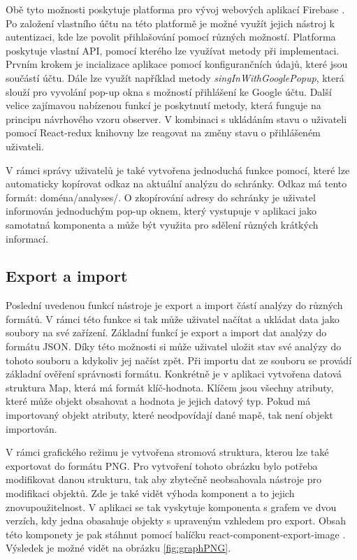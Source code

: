 Obě tyto možnosti poskytuje platforma pro vývoj webových aplikací Firebase \cite{firebase}. Po založení vlastního účtu na této platformě je možné využít jejich nástroj k autentizaci, kde lze povolit přihlašování pomocí různých možností. Platforma poskytuje vlastní API, pomocí kterého lze využívat metody při implementaci. Prvním krokem je incializace aplikace pomocí konfigurančních údajů, které jsou součástí účtu. Dále lze využít například metody \textit{singInWithGooglePopup}, která slouží pro vyvolání pop-up okna s možností přihlášení ke Google účtu. Další velice zajímavou nabízenou funkcí je poskytnutí metody, která funguje na principu návrhového vzoru observer. V kombinaci s ukládáním stavu o uživateli pomocí React-redux knihovny lze reagovat na změny stavu o přihlášeném uživateli. 

V rámci správy uživatelů je také vytvořena jednoduchá funkce pomocí, které lze automaticky kopírovat odkaz na aktuální analýzu do schránky. Odkaz má tento formát: doména/analyses/. O zkopírování adresy do schránky je uživatel informován jednoduchým pop-up oknem, který vystupuje v aplikaci jako samotatná komponenta a může být využita pro sdělení různých krátkých informací.  


\subsection{Export a import}
Poslední uvedenou funkcí nástroje je export a import částí analýzy do různých formátů. V rámci této funkce si tak může uživatel načítat a ukládat data jako soubory na své zařízení. Základní funkcí je export a import dat analýzy do formátu JSON. Díky této možnosti si může uživatel uložit stav své analýzy do tohoto souboru a kdykoliv jej načíst zpět. Při importu dat ze souboru se provádí základní ověření správnosti formátu. Konkrétně je v aplikaci vytvořena datová struktura Map, která má formát klíč-hodnota. Klíčem jsou všechny atributy, které může objekt obsahovat a hodnota je jejich datový typ. Pokud má importovaný objekt atributy, které neodpovídají dané mapě, tak není objekt importován. 

V rámci grafického režimu je vytvořena stromová struktura, kterou lze také exportovat do formátu PNG. Pro vytvoření tohoto obrázku bylo potřeba modifikovat danou strukturu, tak aby zbytečně neobsahovala nástroje pro modifikaci objektů. Zde je také vidět výhoda komponent a to jejich znovupoužitelnost. V aplikaci se tak vyskytuje komponenta s grafem ve dvou verzích, kdy jedna obasahuje objekty s upraveným vzhledem pro export. Obsah této komponety je pak stáhnut pomocí balíčku react-component-export-image \cite{exportIMG}. Výsledek je možné vidět na obrázku \ref{fig:graphPNG}.

